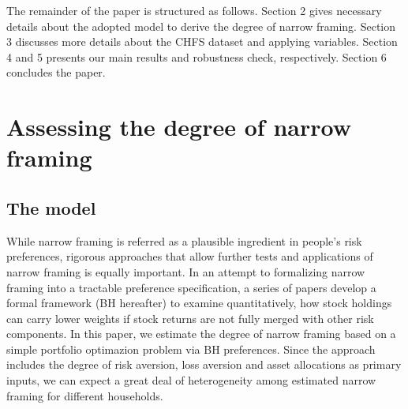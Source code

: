 \documentclass[ukenglish,nottitlepage,thmsb,11pt,letterpaper]{article}
\begin{document}
The remainder of the paper is structured as follows. Section 2 gives necessary details about the adopted model to derive the degree of narrow framing. Section 3 discusses more details about the CHFS dataset and applying variables. Section 4 and 5 presents our main results and robustness check, respectively. Section 6 concludes the paper.

\section{Assessing the degree of narrow framing}
\subsection{The model}
While narrow framing is referred as a plausible ingredient in people's risk preferences, rigorous approaches that allow further tests and applications of narrow framing is equally important. In an attempt to formalizing narrow framing into a tractable preference specification, a series of papers \citep[e.g.,][]{Barberis2001,Barberis2006,Barberis2009} develop a formal framework (BH hereafter) to examine quantitatively, how stock holdings can carry lower weights if stock returns are not fully merged with other risk components. In this paper, we estimate the degree of narrow framing based on a simple portfolio optimazion problem via BH preferences. Since the approach includes the degree of risk aversion, loss aversion and asset allocations as primary inputs, we can expect a great deal of heterogeneity among estimated narrow framing for different households.
\end{document}
